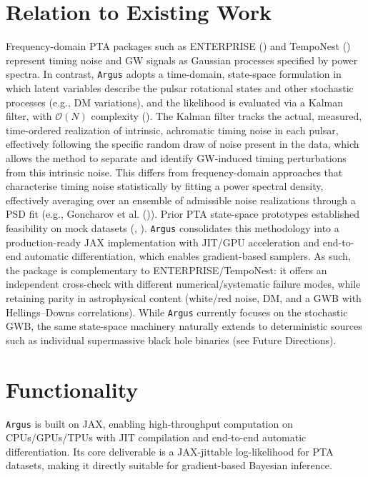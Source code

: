 \documentclass[
]{article}
\begin{document}
\section{Relation to Existing Work}\label{relation-to-existing-work}

Frequency-domain PTA packages such as ENTERPRISE
() and TempoNest
() represent timing
noise and GW signals as Gaussian processes specified by power spectra.
In contrast, \texttt{Argus} adopts a time-domain, state-space
formulation in which latent variables describe the pulsar rotational
states and other stochastic processes (e.g., DM variations), and the
likelihood is evaluated via a Kalman filter, with
\(\mathcal{O}\left(N\right)\) complexity
(). The Kalman filter tracks
the actual, measured, time-ordered realization of intrinsic, achromatic
timing noise in each pulsar, effectively following the specific random
draw of noise present in the data, which allows the method to separate
and identify GW-induced timing perturbations from this intrinsic noise.
This differs from frequency-domain approaches that characterise timing
noise statistically by fitting a power spectral density, effectively
averaging over an ensemble of admissible noise realizations through a
PSD fit (e.g., Goncharov et al. ()).
Prior PTA state-space prototypes established feasibility on mock
datasets (,
). \texttt{Argus} consolidates this
methodology into a production-ready JAX implementation with JIT/GPU
acceleration and end-to-end automatic differentiation, which enables
gradient-based samplers. As such, the package is complementary to
ENTERPRISE/TempoNest: it offers an independent cross-check with
different numerical/systematic failure modes, while retaining parity in
astrophysical content (white/red noise, DM, and a GWB with
Hellings--Downs correlations). While \texttt{Argus} currently focuses on
the stochastic GWB, the same state-space machinery naturally extends to
deterministic sources such as individual supermassive black hole
binaries (see Future Directions).

\section{Functionality}\label{functionality}

\texttt{Argus} is built on JAX, enabling high-throughput computation on
CPUs/GPUs/TPUs with JIT compilation and end-to-end automatic
differentiation. Its core deliverable is a JAX-jittable log-likelihood
for PTA datasets, making it directly suitable for gradient-based
Bayesian inference.
\end{document}
